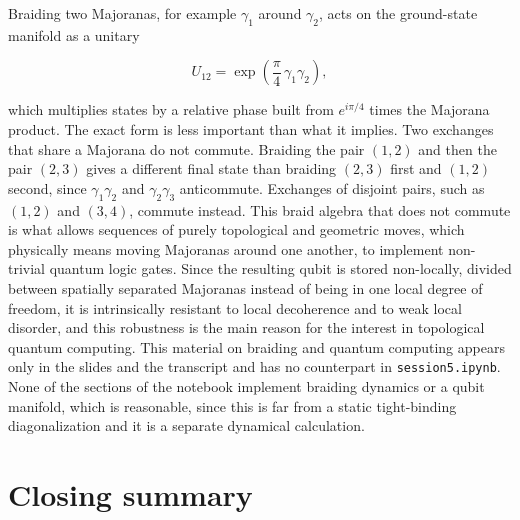 Braiding two Majoranas, for example $\gamma_1$ around $\gamma_2$, acts on the ground-state manifold
as a unitary

\begin{equation}
U_{12} = \exp\left(\frac{\pi}{4}\,\gamma_1\gamma_2\right),
\end{equation}

which multiplies states by a relative phase built from $e^{i\pi/4}$ times the Majorana product. The
exact form is less important than what it implies. Two exchanges that share a Majorana do not commute.
Braiding the pair $(1,2)$ and then the pair $(2,3)$ gives a different final state than braiding
$(2,3)$ first and $(1,2)$ second, since $\gamma_1\gamma_2$ and $\gamma_2\gamma_3$ anticommute.
Exchanges of disjoint pairs, such as $(1,2)$ and $(3,4)$, commute instead. This braid algebra that does not commute is what allows sequences of
purely topological and geometric moves, which physically means moving Majoranas around one another,
to implement non-trivial quantum logic gates. Since the resulting qubit is stored non-locally,
divided between spatially separated Majoranas instead of being in one local degree of freedom, it is
intrinsically resistant to local decoherence and to weak local disorder, and this robustness is the
main reason for the interest in topological quantum computing. This material on braiding and quantum
computing appears only in the slides and the transcript and has no counterpart in
\texttt{session5.ipynb}. None of the sections of the notebook implement braiding dynamics or a qubit
manifold, which is reasonable, since this is far from a static tight-binding diagonalization and it
is a separate dynamical calculation.

\section{Closing summary}

